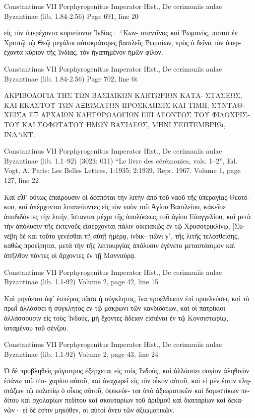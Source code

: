 \documentclass[12pt,letterpaper,twoside,final]{memoir}
\begin{document}
\begin{greek}
Constantinus VII Porphyrogenitus Imperator Hist., De cerimoniis aulae Byzantinae (lib. 1.84-2.56) 
Page 691, line 20

                  εἰς τὸν ὑπερέχοντα κυριεύοντα Ἰνδίας· “Κων-
σταντῖνος καὶ Ῥωμανὸς, πιστοὶ ἐν Χριστῷ τῷ Θεῷ μεγάλοι 
αὐτοκράτορες βασιλεῖς Ῥωμαίων, πρὸς ὁ δεῖνα τὸν ὑπερ-
έχοντα κύριον τῆς Ἰνδίας, τὸν ἠγαπημένον ἡμῶν φίλον. 



Constantinus VII Porphyrogenitus Imperator Hist., De cerimoniis aulae Byzantinae (lib. 1.84-2.56) 
Page 702, line 6t

ΑΚΡΙΒΟΛΟΓΙΑ ΤΗΣ ΤΩΝ ΒΑΣΙΛΙΚΩΝ ΚΛΗΤΩΡΙΩΝ ΚΑΤΑ-
ΣΤΑΣΕΩΣ, ΚΑΙ ΕΚΑΣΤΟΥ ΤΩΝ ΑΞΙΩΜΑΤΩΝ ΠΡΟΣΚΛΗΣΙΣ 
ΚΑΙ ΤΙΜΗ, ΣΥΝΤΑΘΧΕΙΣΑ ΕΞ ΑΡΧΑΙΩΝ ΚΛΗΤΩΡΟΛΟΓΙΩΝ 
ΕΠΙ ΛΕΟΝΤΟΣ ΤΟΥ ΦΙΛΟΧΡΙΣΤΟΥ ΚΑΙ ΣΟΦΩΤΑΤΟΥ ΗΜΩΝ 
ΒΑΣΙΛΕΩΣ, ΜΗΝΙ ΣΕΠΤΕΜΒΡΙΩι, ΙΝΔ*ιΚΤ. 



Constantinus VII Porphyrogenitus Imperator Hist., De cerimoniis aulae Byzantinae (lib. 1.1–92) (3023: 011)
“Le livre des cérémonies, vols. 1–2”, Ed. Vogt, A.
Paris: Les Belles Lettres, 1:1935; 2:1939, Repr. 1967.
Volume 1, page 127, line 22

                                                           Καὶ εἶθ' 
οὕτως ἐπαίρουσιν οἱ δεσπόται τὴν λιτὴν ἀπὸ τοῦ ναοῦ τῆς 
ὑπεραγίας Θεοτόκου, καὶ ἀπέρχονται λιτανεύοντες εἰς τὸν 
ναὸν τοῦ Ἁγίου Βασιλείου, κἀκεῖσε ἀποδιδόντες τὴν λιτήν, 
ἵστανται μέχρι τῆς ἀπολύσεως τοῦ ἁγίου Εὐαγγελίου, καὶ 
μετὰ τὴν ἀπόλυσιν τῆς ἐκτενοῦς εἰσέρχονται πάλιν 
οἰκειακῶς ἐν τῷ Χρυσοτρικλίνῳ, 
[Συνέβη δὲ καὶ τοῦτο γενέσθαι τῇ αὐτῇ ἡμέρᾳ, ἰνδικ-
τιῶνι γʹ, τῆς λιτῆς τελεσθείσης, καθὼς προείρηται, μετὰ   
τὴν τῆς λειτουργίας ἀπόλυσιν ἐγένετο μεταστάσιμον καὶ 
ἀπῆλθον πάντες οἱ ἄρχοντες ἐν τῇ Μανναύρᾳ. 



Constantinus VII Porphyrogenitus Imperator Hist., De cerimoniis aulae Byzantinae (lib. 1.1-92) 
Volume 2, page 42, line 15

                          Καὶ μηνύεται ἀφ' ἑσπέρας πᾶσα ἡ 
σύγκλητος, ἵνα προέλθωσιν ἐπὶ προελεύσει, καὶ τὸ πρωῒ 
ἀλλάσσει ἡ σύγκλητος ἐν τῷ μάκρωνι τῶν κανδιδάτων, καὶ 
οἱ πατρίκιοι ἀλλάσσουσιν εἰς τοὺς Ἰνδούς, μὴ ἔχοντες 
ἄδειαν εἰσιέναι ἐν τῷ Κονσιστωρίῳ, ἱσταμένου τοῦ σένζου. 



Constantinus VII Porphyrogenitus Imperator Hist., De cerimoniis aulae Byzantinae (lib. 1.1-92) 
Volume 2, page 43, line 24

               Ὁ δὲ προβληθεὶς μάγιστρος ἐξέρχεται εἰς 
τοὺς Ἰνδούς, καὶ ἀλλάσσει σαγίον ἀληθινὸν ἐπάνω τοῦ στι-
χαρίου αὐτοῦ, καὶ ἀναχωρεῖ εἰς τὸν οἶκον αὐτοῦ, καὶ εἰ 
μέν ἐστιν πλησιάζων τῷ παλατίῳ ὁ οἶκος αὐτοῦ, ὀψικεύε-
ται ὑπὸ ἀξιωματικῶν καὶ δομεστίκων πεδίτου καὶ σχολαρίων 
πεδίτου καὶ σκουταρίων τοῦ ἀριθμοῦ καὶ διαιταρίων καὶ δεκα-
νῶν· εἰ δέ ἐστιν μηκόθεν, οἱ αὐτοὶ ἄνευ τῶν ἀξιωματικῶν. 


\end{greek}
\end{document}
